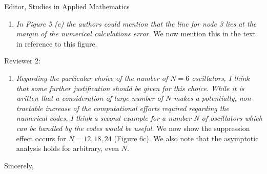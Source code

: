 \documentclass[11pt]{letter}
\begin{document}
\begin{letter}{Editor, Studies in Applied Mathematics}
\begin{enumerate}
    \item \emph{In Figure 5 (e) the authors could mention that the line for node 3 lies at the margin of the numerical calculations error.} We now mention this in the text in reference to this figure.
    \vspace{4mm}
\end{enumerate}

Reviewer 2:
\begin{enumerate}
    \item \emph{Regarding the particular choice of the number of $N = 6$ oscillators, I think that some further justification should be given for this choice. While it is written that a consideration of large number of $N$ makes a potentially, non-tractable increase of the computational efforts required regarding the numerical codes, I think a second example for a number N of oscillators which can be handled by the codes would be useful.} We now show the suppression effect occurs for $N=12,18,24$ (Figure 6c). We also note that the asymptotic analysis holds for arbitrary, even $N$.
\end{enumerate}

\closing{Sincerely,}

\end{letter}
\end{document}
